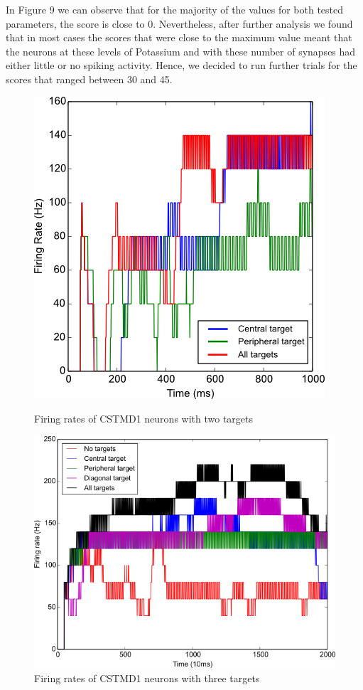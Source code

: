 \documentclass[a4paper,11pt]{article}
\begin{document}
In Figure 9 we can observe that for the majority of the values for both tested parameters, the score is close to 0. Nevertheless, after further analysis we found that in most cases the scores that were close to the maximum value meant that the neurons at these levels of Potassium and with these number of synapses had either little or no spiking activity. Hence, we decided to run further trials 
for the scores that ranged between 30 and 45.
\begin{figure}[H]
\begin{minipage}{0.5\textwidth}
\centering
\includegraphics[scale = 0.5]{cstmd_2tars}
\caption{Firing rates of CSTMD1 neurons with two targets}
\end{minipage}
\begin{minipage}{0.5\textwidth}
\centering
\includegraphics[scale = 0.43]{cstmd_3tars}
\caption{Firing rates of CSTMD1 neurons with three targets}
\end{minipage}
\end{figure}
\end{document}
